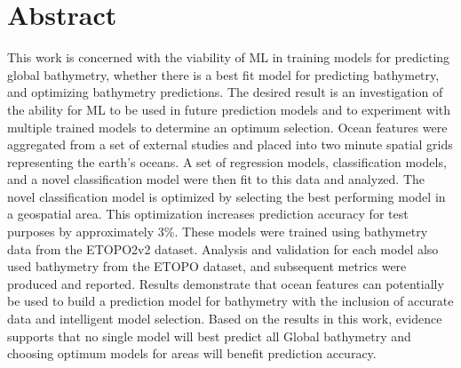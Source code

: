 \setcounter{secnumdepth}{0}
\section{Abstract}
\setlength{\parindent}{10ex}
This work is concerned with the viability of \ac{ML} in training models for predicting global bathymetry, whether there is a best fit model for predicting bathymetry, and optimizing bathymetry predictions. 
The desired result is an investigation of the ability for ML to be used in future prediction models and to experiment with multiple trained models 
to determine an optimum selection. Ocean features were aggregated from a set of external studies and placed into two minute spatial grids representing 
the earth's oceans. A set of regression models, classification models, and a novel classification model were then fit to this data and analyzed. 
The novel classification model is optimized by selecting the best performing model in a geospatial area. This optimization increases prediction accuracy
for test purposes by approximately 3\%. 
These models were trained using bathymetry data from the ETOPO2v2 dataset. Analysis and validation for each model also used bathymetry from the 
ETOPO dataset, and subsequent metrics were produced and reported. Results demonstrate that ocean features can potentially be used to build a 
prediction model for bathymetry with the inclusion of accurate data and intelligent model selection. Based on the results in this work, evidence 
supports that no single model will best predict all Global bathymetry and choosing optimum models for areas will benefit prediction accuracy.